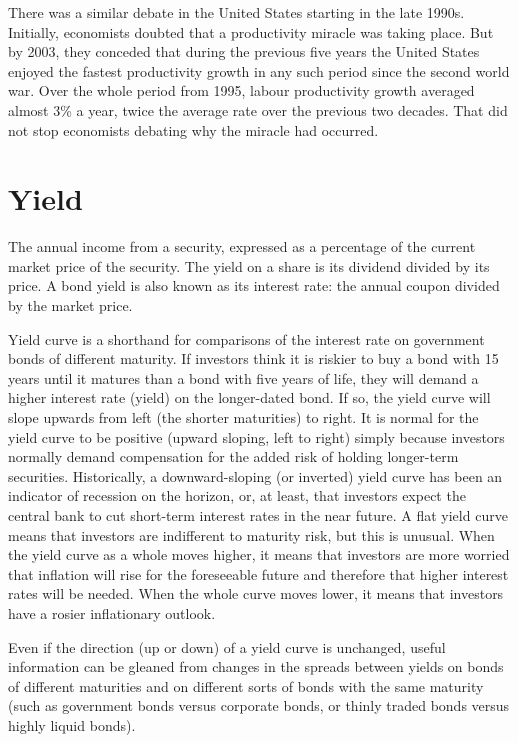 \documentclass[11pt,]{book}
\theoremstyle{definition}
\theoremstyle{definition}
\theoremstyle{definition}
\theoremstyle{remark}
\begin{document}
There was a similar debate in the United States starting in the late
1990s. Initially, economists doubted that a productivity miracle was
taking place. But by 2003, they conceded that during the previous five
years the United States enjoyed the fastest productivity growth in any
such period since the second world war. Over the whole period from 1995,
labour productivity growth averaged almost 3\% a year, twice the average
rate over the previous two decades. That did not stop economists
debating why the miracle had occurred.

\section{Yield}\label{yield}

The annual income from a security, expressed as a percentage of the
current market price of the security. The yield on a share is its
dividend divided by its price. A bond yield is also known as its
interest rate: the annual coupon divided by the market price.

Yield curve is a shorthand for comparisons of the interest rate on
government bonds of different maturity. If investors think it is riskier
to buy a bond with 15 years until it matures than a bond with five years
of life, they will demand a higher interest rate (yield) on the
longer-dated bond. If so, the yield curve will slope upwards from left
(the shorter maturities) to right. It is normal for the yield curve to
be positive (upward sloping, left to right) simply because investors
normally demand compensation for the added risk of holding longer-term
securities. Historically, a downward-sloping (or inverted) yield curve
has been an indicator of recession on the horizon, or, at least, that
investors expect the central bank to cut short-term interest rates in
the near future. A flat yield curve means that investors are indifferent
to maturity risk, but this is unusual. When the yield curve as a whole
moves higher, it means that investors are more worried that inflation
will rise for the foreseeable future and therefore that higher interest
rates will be needed. When the whole curve moves lower, it means that
investors have a rosier inflationary outlook.

Even if the direction (up or down) of a yield curve is unchanged, useful
information can be gleaned from changes in the spreads between yields on
bonds of different maturities and on different sorts of bonds with the
same maturity (such as government bonds versus corporate bonds, or
thinly traded bonds versus highly liquid bonds).
\end{document}
